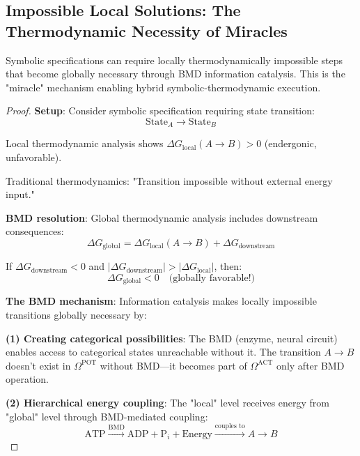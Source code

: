 \subsection{Impossible Local Solutions: The Thermodynamic Necessity of Miracles}

\begin{theorem}
\label{thm:local_impossibility}
Symbolic specifications can require locally thermodynamically impossible steps that become globally necessary through BMD information catalysis. This is the "miracle" mechanism enabling hybrid symbolic-thermodynamic execution.
\end{theorem}

\begin{proof}
\textbf{Setup}: Consider symbolic specification requiring state transition:
\begin{equation}
\text{State}_A \to \text{State}_B
\end{equation}

Local thermodynamic analysis shows $\Delta G_{\text{local}}(A \to B) > 0$ (endergonic, unfavorable).

Traditional thermodynamics: "Transition impossible without external energy input."

\textbf{BMD resolution}: Global thermodynamic analysis includes downstream consequences:
\begin{equation}
\Delta G_{\text{global}} = \Delta G_{\text{local}}(A \to B) + \Delta G_{\text{downstream}}
\end{equation}

If $\Delta G_{\text{downstream}} < 0$ and $|\Delta G_{\text{downstream}}| > |\Delta G_{\text{local}}|$, then:
\begin{equation}
\Delta G_{\text{global}} < 0 \quad \text{(globally favorable!)}
\end{equation}

\textbf{The BMD mechanism}: Information catalysis makes locally impossible transitions globally necessary by:

\textbf{(1) Creating categorical possibilities}: The BMD (enzyme, neural circuit) enables access to categorical states unreachable without it. The transition $A \to B$ doesn't exist in $\Omega^{\text{POT}}$ without BMD—it becomes part of $\Omega^{\text{ACT}}$ only after BMD operation.

\textbf{(2) Hierarchical energy coupling}: The "local" level receives energy from "global" level through BMD-mediated coupling:
\begin{equation}
\text{ATP} \xrightarrow{\text{BMD}} \text{ADP} + \text{P}_i + \text{Energy} \xrightarrow{\text{couples to}} A \to B
\end{equation}


\end{proof}
